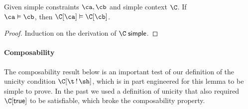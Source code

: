 \documentclass[acmsmall,screen,nonacm%
\Anonymous{,anonymous}{}%
\Final{}{,review}%
]{acmart}
\begin{document}
\begin{lemma}
  \label{lem:cong-simple}
  Given simple constraints $\ca, \cb$ and simple context $\C$.
  If \\$\ca \centails \cb$, then $\C\where{\ca} \centails \C\where{\cb}$.

  \begin{proof}
    Induction on the derivation of $\C \simple$.
  \end{proof}
\end{lemma}

\paragraph{Composability}

The composability result below is an important test of our definition of the
unicity condition $\Cshape \C \t \sh$, which is in part engineered for this
lemma to be simple to prove. In the past we used a definition of unicity
that also required $\C \where \ctrue$ to be satisfiable, which broke the
composability property.
\end{document}
